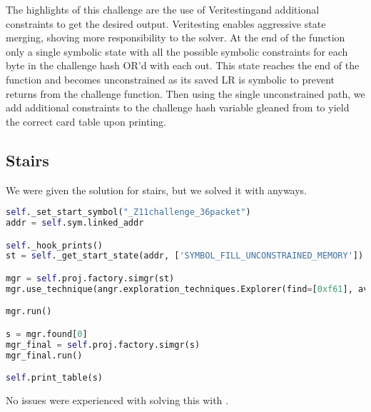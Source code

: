 The highlights of this challenge are the use of Veritesting\needref and additional constraints to get the desired output. Veritesting enables aggressive state merging, shoving more responsibility to the solver. At the end of the function only a single symbolic state with all the possible symbolic constraints for each byte in the challenge hash OR'd with each out. This state reaches the end of the function and becomes unconstrained as its saved LR is symbolic to prevent returns from the challenge function. Then using the single unconstrained path, we add additional constraints to the challenge hash variable gleaned from \ghidra to yield the correct card table upon printing.

\subsection{Stairs}
We were given the solution for stairs, but we solved it with \angr anyways.

\begin{lstlisting}[language=python]
self._set_start_symbol("_Z11challenge_36packet")
addr = self.sym.linked_addr

self._hook_prints()
st = self._get_start_state(addr, ['SYMBOL_FILL_UNCONSTRAINED_MEMORY'])

mgr = self.proj.factory.simgr(st)
mgr.use_technique(angr.exploration_techniques.Explorer(find=[0xf61], avoid=[0xf85,0xf39]))

mgr.run()

s = mgr.found[0]
mgr_final = self.proj.factory.simgr(s)
mgr_final.run()

self.print_table(s)
\end{lstlisting}

\noindent No issues were experienced with solving this with \angr.
